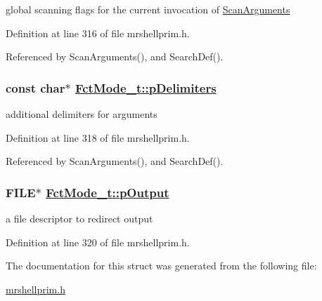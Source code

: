 global scanning flags for the current invocation of \hyperlink{mrshellprim_8h_e2735ecedc52b1199ecf8a208339c072}{Scan\-Arguments} 



Definition at line 316 of file mrshellprim.h.

Referenced by Scan\-Arguments(), and Search\-Def().\hypertarget{structFctMode__t_4b05e60cd819bcb5aa2eb72cf8764659}{
\subsubsection[pDelimiters]{\setlength{\rightskip}{0pt plus 5cm}const char$\ast$ \hyperlink{structFctMode__t_4b05e60cd819bcb5aa2eb72cf8764659}{Fct\-Mode\_\-t::p\-Delimiters}}}
\label{structFctMode__t_4b05e60cd819bcb5aa2eb72cf8764659}


additional delimiters for arguments 



Definition at line 318 of file mrshellprim.h.

Referenced by Scan\-Arguments(), and Search\-Def().\hypertarget{structFctMode__t_877976072dcbbc142505fb07dcb14673}{
\subsubsection[pOutput]{\setlength{\rightskip}{0pt plus 5cm}FILE$\ast$ \hyperlink{structFctMode__t_877976072dcbbc142505fb07dcb14673}{Fct\-Mode\_\-t::p\-Output}}}
\label{structFctMode__t_877976072dcbbc142505fb07dcb14673}


a file descriptor to redirect output 



Definition at line 320 of file mrshellprim.h.

The documentation for this struct was generated from the following file:\begin{CompactItemize}
\item 
\hyperlink{mrshellprim_8h}{mrshellprim.h}\end{CompactItemize}

